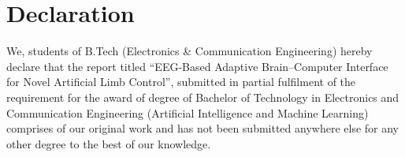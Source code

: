\chapter*{Declaration}
We, students of B.Tech (Electronics \& Communication Engineering) hereby declare that the
report titled ``EEG-Based Adaptive Brain--Computer Interface for Novel Artificial Limb
Control'', submitted in partial fulfilment of the requirement for the award of degree of
Bachelor of Technology in Electronics and Communication Engineering (Artificial Intelligence
and Machine Learning) comprises of our original work and has not been submitted anywhere
else for any other degree to the best of our knowledge.

\vspace{2.5cm}
\begin{flushright}
\StudentOne\\[2.2cm]
\StudentTwo\\[2.2cm]
\StudentThree
\end{flushright}
